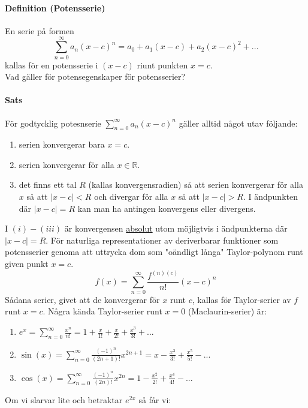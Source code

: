 \paragraph{Definition (Potensserie)}
En serie på formen
\begin{equation*}
    \sum_{n=0}^\infty a_n(x-c)^n=
    a_0+a_1(x-c)+a_2(x-c)^2+...
\end{equation*}
kallas för en potensserie i $(x-c)$ riunt punkten $x=c$.
\\
Vad gäller för potensegenskaper för potensserier?
\paragraph*{Sats}
För godtycklig potesnserie $\sum_{n=0}^\infty a_n(x-c)^n$ gäller alltid något utav följande:
\begin{enumerate}[label=(\roman*)]
    \item serien konvergerar bara $x=c$.
    \item serien konvergerar för alla $x\in\mathbb{R}$.
    \item det finns ett tal $R$ (kallas konvergensradien) så att serien konvergerar för alla $x$ så att $|x-c|<R$ och divergar för alla $x$ så att $|x-c| >R$.
          I ändpunkten där $|x-c|=R$ kan man ha antingen konvergens eller divergens.
\end{enumerate}
I $(i)-(iii)$ är konvergensen \underline{absolut} utom möjligtvis i ändpunkterna där \\
$|x-c|=R$.
För naturliga representationer av deriverbarar funktioner som potensserier genoma att uttrycka dom som "oändligt långa" Taylor-polynom runt given punkt $x=c$.
\begin{equation*}
    f(x)=\sum_{n=0}^\infty\frac{f^{(n)(c)}}{n!}(x-c)^n
\end{equation*}
Sådana serier, givet att de konvergerar för $x$ runt $c$,
kallas för Taylor-serier av $f$ runt $x=c$.
Några kända Taylor-serier runt $x=0$ (Maclaurin-serier) är:
\begin{enumerate}
    \item $e^x=\sum_{n=0}^\infty\frac{x^n}{n!}=1+\frac{x}{1!}+\frac{x}{2!}+\frac{x^3}{3!}+...$
    \item $\sin(x)=\sum_{n=0}^\infty\frac{(-1)^n}{(2n+1)!}x^{2n+1}=x-\frac{x^3}{3!}+\frac{x^5}{5!}-...$
    \item $\cos(x)=\sum_{n=0}^\infty\frac{(-1)^n}{(2n)!}x^{2n}=1-\frac{x^2}{2!}+\frac{x^4}{4!}-...$
\end{enumerate}
Om vi slarvar lite och betraktar $e^{2x}$ så får vi:
